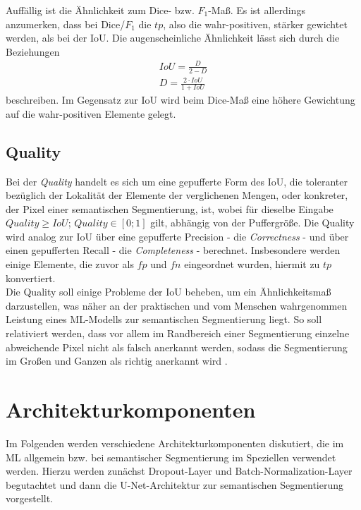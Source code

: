 Auffällig ist die Ähnlichkeit zum Dice- bzw. $F_{1}$-Maß. Es ist allerdings anzumerken, dass bei Dice/$F_1$ die $tp$, also die wahr-positiven, stärker gewichtet werden, als bei der \ac{IoU}. Die augenscheinliche Ähnlichkeit lässt sich durch die Beziehungen
\begin{align}
	\label{eq:dice-iou} IoU = \frac{D}{2 - D} \\
	D = \frac{2 \cdot IoU}{1 + IoU}
\end{align}
beschreiben.
Im Gegensatz zur \ac{IoU} wird beim Dice-Maß eine höhere Gewichtung auf die wahr-positiven Elemente 
gelegt.

\subsection{Quality}

Bei der \textit{Quality} handelt es sich um eine gepufferte Form des \ac{IoU},
die toleranter bezüglich der Lokalität der Elemente der verglichenen Mengen, oder konkreter,
der Pixel einer semantischen Segmentierung, ist, 
wobei für dieselbe Eingabe $Quality \geq IoU$; $Quality \in [0;1]$ gilt, abhängig von der Puffergröße. 
Die Quality wird analog zur \ac{IoU} über eine gepufferte Precision - die \textit{Correctness} - 
und über einen gepufferten Recall - die \textit{Completeness} - berechnet. Insbesondere werden einige Elemente, 
die zuvor als $fp$ und $fn$ eingeordnet wurden, hiermit zu $tp$ konvertiert. \\
Die Quality soll einige Probleme der \ac{IoU} beheben, um ein Ähnlichkeitsmaß darzustellen, 
was näher an der praktischen und vom Menschen wahrgenommen Leistung eines \ac{ML}-Modells zur semantischen Segmentierung liegt.
So soll relativiert werden, dass vor allem im Randbereich einer Segmentierung einzelne abweichende Pixel
nicht als falsch anerkannt werden, sodass die Segmentierung im Großen und Ganzen als richtig anerkannt wird \cite{ChristianWiedemann.1998}. 


\section{Architekturkomponenten}

Im Folgenden werden verschiedene Architekturkomponenten diskutiert, die im \ac{ML} allgemein 
bzw. bei semantischer Segmentierung im Speziellen verwendet werden. Hierzu werden zunächst Dropout-Layer 
und Batch-Normalization-Layer begutachtet und dann die U-Net-Architektur zur semantischen Segmentierung vorgestellt. 

